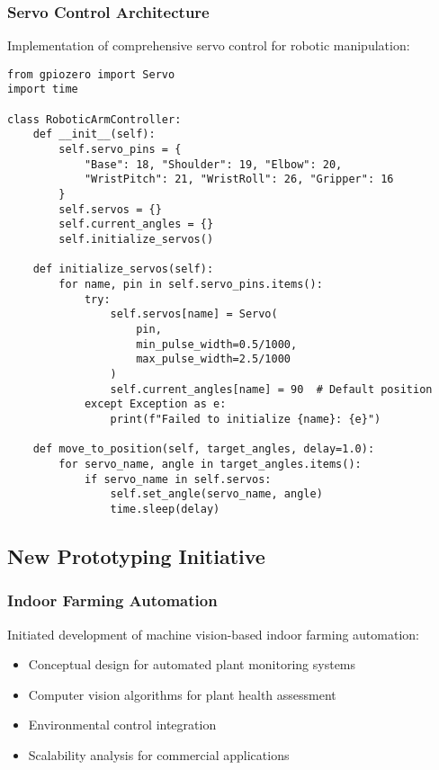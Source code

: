 \documentclass[12pt]{article}
\begin{document}
\subsubsection{Servo Control Architecture}
Implementation of comprehensive servo control for robotic manipulation:

\begin{lstlisting}[style=pythonstyle, caption={Servo Control System}]
from gpiozero import Servo
import time

class RoboticArmController:
    def __init__(self):
        self.servo_pins = {
            "Base": 18, "Shoulder": 19, "Elbow": 20,
            "WristPitch": 21, "WristRoll": 26, "Gripper": 16
        }
        self.servos = {}
        self.current_angles = {}
        self.initialize_servos()
        
    def initialize_servos(self):
        for name, pin in self.servo_pins.items():
            try:
                self.servos[name] = Servo(
                    pin, 
                    min_pulse_width=0.5/1000, 
                    max_pulse_width=2.5/1000
                )
                self.current_angles[name] = 90  # Default position
            except Exception as e:
                print(f"Failed to initialize {name}: {e}")
                
    def move_to_position(self, target_angles, delay=1.0):
        for servo_name, angle in target_angles.items():
            if servo_name in self.servos:
                self.set_angle(servo_name, angle)
                time.sleep(delay)
\end{lstlisting}

\subsection{New Prototyping Initiative}

\subsubsection{Indoor Farming Automation}
Initiated development of machine vision-based indoor farming automation:
\begin{itemize}
\item Conceptual design for automated plant monitoring systems
\item Computer vision algorithms for plant health assessment
\item Environmental control integration
\item Scalability analysis for commercial applications
\end{itemize}
\end{document}
